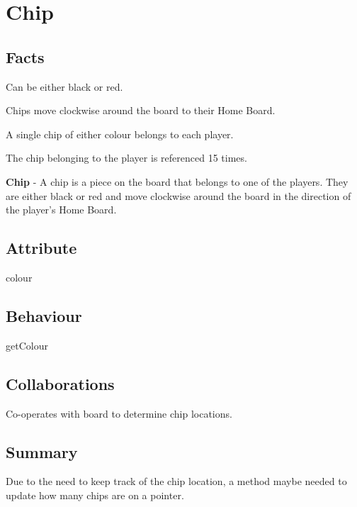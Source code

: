 \section{Chip}

\subsection{Facts}
\begin{dashed}
    \item Can be either black or red.
    \item Chips move clockwise around the board to their Home Board.
    \item A single chip of either colour belongs to each player.
    \item The chip belonging to the player is referenced 15 times.
\end{dashed}

\noindent
\newline\textbf{Chip} - A chip is a piece on the board that belongs to one of the players. They are either black or red and move clockwise around the board in the direction of the player's Home Board.

\subsection{Attribute}
\begin{dashed}
    \item colour
\end{dashed}

\subsection{Behaviour}
\begin{dashed}
    \item getColour
\end{dashed}

\subsection{Collaborations}
\begin{dashed}
    \item Co-operates with board to determine chip locations.
\end{dashed}

\subsection{Summary}
Due to the need to keep track of the chip location, a method maybe needed to update how many chips
are on a pointer.
